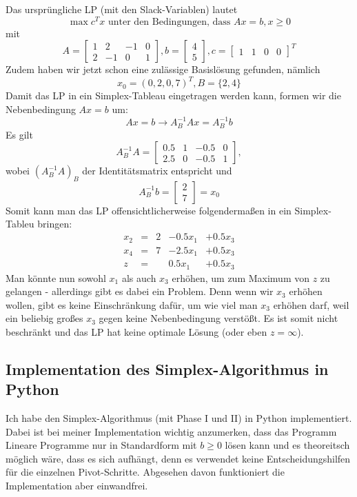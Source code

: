 \documentclass{article}
\begin{document}
Das ursprüngliche LP (mit den Slack-Variablen) lautet\[
\max c^Tx \text{ unter den Bedingungen, dass } Ax=b, x\geq0
\]mit \[
A=\begin{bmatrix}
    1&2&-1&0\\
    2&-1&0&1
\end{bmatrix},b=\begin{bmatrix}
    4\\5
\end{bmatrix},c=\begin{bmatrix}
    1&1&0&0
\end{bmatrix}^T
\]Zudem haben wir jetzt schon eine zulässige Basislösung gefunden, nämlich\[
x_0=(0,2,0,7)^T,B=\{2,4\}
\]Damit das LP in ein Simplex-Tableau eingetragen werden kann, formen wir die Nebenbedingung \(Ax=b\) um:\[
Ax=b\to A_B^{-1}Ax=A_B^{-1}b
\]Es gilt\[
A_B^{-1}A=\begin{bmatrix}
    0.5&1&-0.5&0\\
    2.5&0&-0.5&1
\end{bmatrix},
\]wobei \((A_B^{-1}A)_B\) der Identitätsmatrix entspricht und\[
A_B^{-1}b=\begin{bmatrix}
    2\\7
\end{bmatrix}=x_0
\]Somit kann man das LP offensichtlicherweise folgendermaßen in ein Simplex-Tableu bringen:
\[
\begin{matrix}
    x_2&=&2&-0.5x_1&+0.5x_3\\
    x_4&=&7&-2.5x_1&+0.5x_3\\
    \hline
    z&=&&0.5x_1&+0.5x_3
\end{matrix}
\]Man könnte nun sowohl \(x_1\) als auch \(x_3\) erhöhen, um zum Maximum von \(z\) zu gelangen - allerdings gibt es dabei ein Problem. Denn wenn wir \(x_3\) erhöhen wollen, gibt es keine Einschränkung dafür, um wie viel man \(x_3\) erhöhen darf, weil ein beliebig großes \(x_3\) gegen keine Nebenbedingung verstößt. Es ist somit nicht beschränkt und das LP hat keine optimale Lösung (oder eben \(z=\infty\)).

\subsection{Implementation des Simplex-Algorithmus in Python}
Ich habe den Simplex-Algorithmus (mit Phase I und II) in Python implementiert. Dabei ist bei meiner Implementation wichtig anzumerken, dass das Programm Lineare Programme nur in Standardform mit \(b\geq0\) lösen kann und es theoreitsch möglich wäre, dass es sich aufhängt, denn es verwendet keine Entscheidungshilfen für die einzelnen Pivot-Schritte. Abgesehen davon funktioniert die Implementation aber einwandfrei. 
\end{document}
